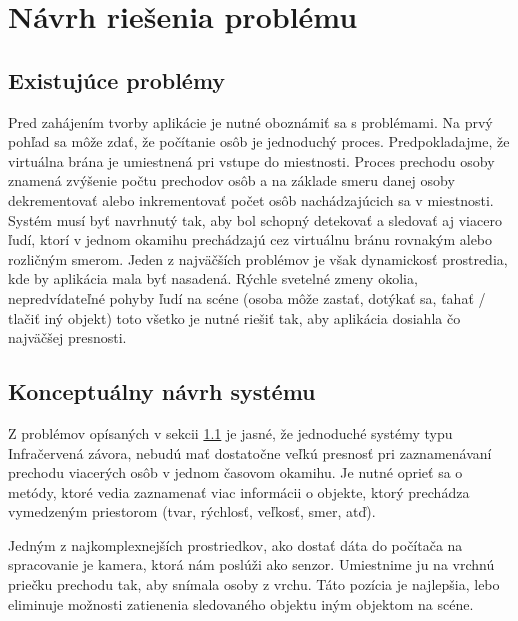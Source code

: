 

\chapter{Návrh riešenia problému}
\section{Existujúce problémy}
\label{sec:problems}
Pred zahájením tvorby aplikácie je nutné oboznámiť sa s problémami. Na prvý pohľad  sa môže zdať, že  počítanie osôb je jednoduchý proces. Predpokladajme, že virtuálna brána je umiestnená pri vstupe do miestnosti. Proces prechodu osoby znamená zvýšenie počtu prechodov osôb a na základe smeru danej osoby dekrementovať alebo inkrementovať počet osôb nachádzajúcich sa v miestnosti. Systém musí byť navrhnutý tak, aby bol schopný detekovať a sledovať aj viacero ľudí, ktorí v jednom okamihu prechádzajú cez virtuálnu bránu rovnakým alebo rozličným smerom. Jeden z najväčších problémov je však dynamickosť prostredia, kde by aplikácia mala byť nasadená. Rýchle svetelné zmeny okolia, nepredvídateľné pohyby ľudí na scéne (osoba môže zastať, dotýkať sa, ťahať / tlačiť iný objekt) toto všetko je nutné riešiť tak, aby aplikácia dosiahla čo najväčšej presnosti. 

\section{Konceptuálny návrh systému}
\label{sec:draft}
Z problémov opísaných v sekcii \ref{sec:problems} je jasné, že jednoduché systémy typu Infračervená závora, nebudú mať dostatočne veľkú presnosť pri zaznamenávaní prechodu viacerých osôb v jednom časovom okamihu. Je nutné oprieť sa o metódy, ktoré vedia zaznamenať viac informácii o objekte, ktorý prechádza vymedzeným priestorom (tvar, rýchlosť, veľkosť, smer, atď). 

Jedným z najkomplexnejších prostriedkov, ako dostať dáta do počítača na spracovanie je kamera, ktorá nám poslúži ako senzor. Umiestnime ju na vrchnú priečku prechodu tak, aby snímala osoby z vrchu. Táto pozícia je najlepšia, lebo eliminuje možnosti zatienenia sledovaného objektu iným objektom na scéne.  

